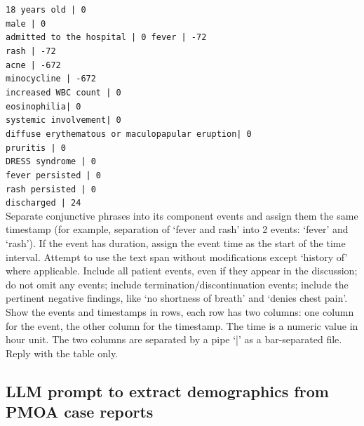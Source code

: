 \begin{tcolorbox}[colback=gray!5, colframe=gray!100, title=Prompt, boxrule=2pt]
\texttt{18 years old | 0 \\
male | 0 \\
admitted to the hospital | 0
fever | -72 \\
rash | -72 \\
acne | -672 \\
minocycline | -672 \\
increased WBC count | 0 \\
eosinophilia| 0 \\
systemic involvement| 0 \\
diffuse erythematous or maculopapular eruption| 0 \\
pruritis | 0 \\
DRESS syndrome | 0 \\
fever persisted | 0 \\
rash persisted | 0 \\
discharged | 24} \\

Separate conjunctive phrases into its component events and assign them the same timestamp (for example, separation of ‘fever and rash’ into 2 events: ‘fever’ and ‘rash’). If the event has duration, assign the event time as the start of the time interval. Attempt to use the text span without modifications except ‘history of’ where applicable. Include all patient events, even if they appear in the discussion; do not omit any events; include termination/discontinuation events; include the pertinent negative findings, like ‘no shortness of breath’ and ‘denies chest pain’. Show the events and timestamps in rows, each row has two columns: one column for the event, the other column for the timestamp. The time is a numeric value in hour unit. The two columns are separated by a pipe ‘|’ as a bar-separated file. Reply with the table only.
\end{tcolorbox}



\subsection{LLM prompt to extract demographics from PMOA case reports}
\label{apd:demographics_prompt}

